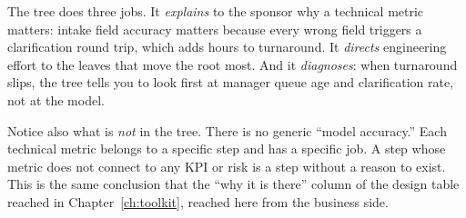 The tree does three jobs. It \emph{explains} to the sponsor why a technical metric matters: intake field accuracy matters because every wrong field triggers a clarification round trip, which adds hours to turnaround. It \emph{directs} engineering effort to the leaves that move the root most. And it \emph{diagnoses}: when turnaround slips, the tree tells you to look first at manager queue age and clarification rate, not at the model.

Notice also what is \emph{not} in the tree. There is no generic ``model accuracy.'' Each technical metric belongs to a specific step and has a specific job. A step whose metric does not connect to any KPI or risk is a step without a reason to exist. This is the same conclusion that the ``why it is there'' column of the design table reached in Chapter~\ref{ch:toolkit}, reached here from the business side.
